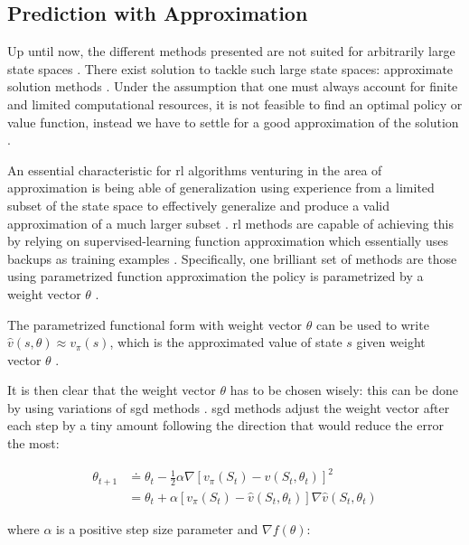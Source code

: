 \documentclass[draft=false]{seal_thesis}
\begin{document}
\subsection{ Prediction with Approximation}
\label{subsec:onpol_pred}

Up until now, the different methods presented are not suited for arbitrarily large state spaces \citep{Sutton2017}. There exist solution to tackle such large state spaces: approximate solution methods \citep{Sutton2017}. Under the assumption that one must always account for finite and limited computational resources, it is not feasible to find an optimal policy or value function, instead we have to settle for a good approximation of the solution \citep[p. 189]{Sutton2017}.

An essential characteristic for \gls{rl} algorithms venturing in the area of approximation is being able of generalization \ie using experience from a limited subset of the state space to effectively generalize and produce a valid approximation of a much larger subset  \citep[p. 189]{Sutton2017}. \gls{rl} methods are capable of achieving this by relying on supervised-learning function approximation which essentially uses backups as training examples \citep[p. 222]{Sutton2017}. Specifically, one brilliant set of methods are those using parametrized function approximation \ie the policy is parametrized by a weight vector $\theta$ \citep{Sutton2017}.

The parametrized functional form with weight vector $\theta$ can be used to write $\hat{v}(s,\theta) \approx v_\pi (s)$, which is the approximated value of state $s$ given weight vector $\theta$ \citep[p. 191]{Sutton2017}.

It is then clear that the weight vector $\theta$ has to be chosen wisely: this can be done by using variations of \gls{sgd} methods \citep[p. 223]{Sutton2017}. \gls{sgd} methods adjust the weight vector after each step by a tiny amount following the direction that would reduce the error the most:

\begin{align}
	\theta_{t+1} &\doteq \theta_t - \frac{1}{2} \alpha \nabla [v_\pi (S_t) - \hat{v} (S_t,\theta_t)]^2\\
	&= \theta_t + \alpha  [v_\pi (S_t) - \hat{v} (S_t,\theta_t)] \nabla \hat{v} (S_t,\theta_t)
\end{align}

where $\alpha$ is a positive step size parameter and $\nabla f(\theta)$:
\end{document}
